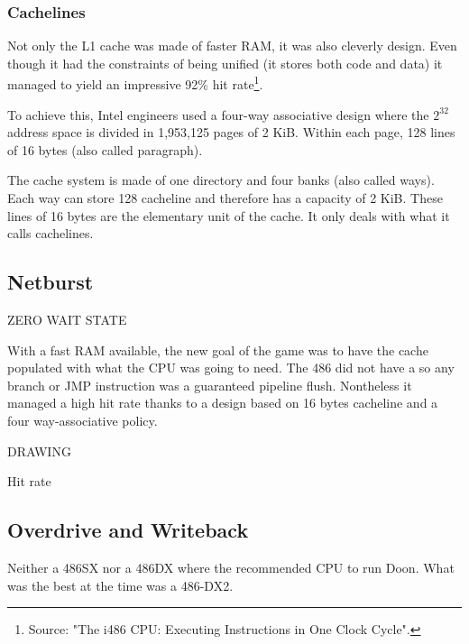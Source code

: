 \subsubsection{Cachelines}
Not only the L1 cache was made of faster RAM, it was also cleverly design. Even though it had the constraints of being unified (it stores both code and data) it managed to yield an impressive 92\% hit rate\footnote{Source: "The i486 CPU: Executing Instructions in One Clock Cycle".}.\\
\par
To achieve this, Intel engineers used a four-way associative design where the $2^{32}$ address space is divided in 1,953,125 pages of 2 KiB. Within each page, 128 lines of 16 bytes (also called paragraph).\\
\par
{}
\par
The cache system is made of one directory and four banks (also called ways). Each way can store 128 cacheline and therefore has a capacity of 2 KiB. These lines of 16 bytes are the elementary unit of the cache. It only deals with what it calls cachelines.\\
\par
{}






\subsection{Netburst}
ZERO WAIT STATE\\
\par
With a fast RAM available, the new goal of the game was to have the cache populated with what the CPU was going to need. The 486 did not have a  so any branch or JMP instruction was a guaranteed pipeline flush. Nontheless it managed a high hit rate thanks to a design based on 16 bytes cacheline and a four way-associative policy.\\
\par
DRAWING\\
\par
Hit rate









\subsection{Overdrive and Writeback}
Neither a 486SX nor a 486DX where the recommended CPU to run Doon. What was the best at the time was a 486-DX2.\\
\par 
{}


